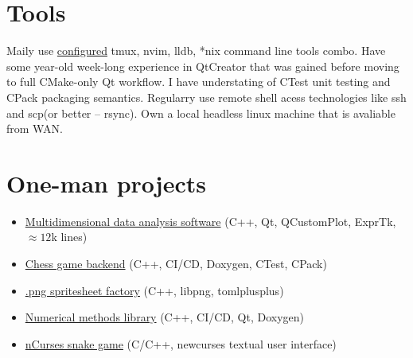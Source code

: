 \section{Tools}
Maily use \href{https://github.com//Dolfost/dotfiles}{configured} tmux, nvim,
lldb, *nix command line tools combo. Have some year-old week-long experience in
QtCreator that was gained before moving to full CMake-only Qt workflow. I have
understating of CTest unit testing and CPack packaging semantics. Regularry use
remote shell acess technologies like ssh and scp(or better -- rsync). Own a
local headless linux machine that is avaliable from WAN.

\section{One-man projects}
\begin{itemize}
	\item \href{https://github.com/Dolfost/matstat}{Multidimensional data analysis software} (C++, Qt, QCustomPlot, ExprTk, \(\approx 12\)k lines)
	\item \href{https://github.com/Dolfost/tartan}{Chess game backend} (C++, CI/CD, Doxygen, CTest, CPack)
	\item \href{https://github.com/Dolfost/ssmk/tree/develop}{.png spritesheet factory} (C++, libpng, tomlplusplus)
	\item \href{https://github.com/Dolfost/calgo}{Numerical methods library} (C++, CI/CD, Qt, Doxygen) 
	\item \href{https://github.com/Dolfost/snake-cpp}{nCurses snake game} (C/C++, newcurses textual user interface)
\end{itemize}


